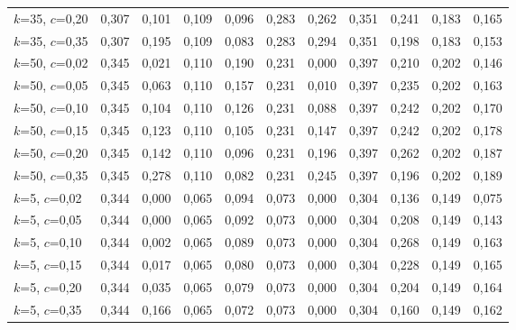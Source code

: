 \begin{longtable}{lrrrrrrrrrr}
$k$=35, $c$=0,20 & 0,307 & 0,101 & 0,109 & 0,096 & 0,283 & 0,262 & 0,351 & 0,241 & 0,183 & 0,165 \\
$k$=35, $c$=0,35 & 0,307 & 0,195 & 0,109 & 0,083 & 0,283 & 0,294 & 0,351 & 0,198 & 0,183 & 0,153 \\
$k$=50, $c$=0,02 & 0,345 & 0,021 & 0,110 & 0,190 & 0,231 & 0,000 & 0,397 & 0,210 & 0,202 & 0,146 \\
$k$=50, $c$=0,05 & 0,345 & 0,063 & 0,110 & 0,157 & 0,231 & 0,010 & 0,397 & 0,235 & 0,202 & 0,163 \\
$k$=50, $c$=0,10 & 0,345 & 0,104 & 0,110 & 0,126 & 0,231 & 0,088 & 0,397 & 0,242 & 0,202 & 0,170 \\
$k$=50, $c$=0,15 & 0,345 & 0,123 & 0,110 & 0,105 & 0,231 & 0,147 & 0,397 & 0,242 & 0,202 & 0,178 \\
$k$=50, $c$=0,20 & 0,345 & 0,142 & 0,110 & 0,096 & 0,231 & 0,196 & 0,397 & 0,262 & 0,202 & 0,187 \\
$k$=50, $c$=0,35 & 0,345 & 0,278 & 0,110 & 0,082 & 0,231 & 0,245 & 0,397 & 0,196 & 0,202 & 0,189 \\
$k$=5, $c$=0,02 & 0,344 & 0,000 & 0,065 & 0,094 & 0,073 & 0,000 & 0,304 & 0,136 & 0,149 & 0,075 \\
$k$=5, $c$=0,05 & 0,344 & 0,000 & 0,065 & 0,092 & 0,073 & 0,000 & 0,304 & 0,208 & 0,149 & 0,143 \\
$k$=5, $c$=0,10 & 0,344 & 0,002 & 0,065 & 0,089 & 0,073 & 0,000 & 0,304 & 0,268 & 0,149 & 0,163 \\
$k$=5, $c$=0,15 & 0,344 & 0,017 & 0,065 & 0,080 & 0,073 & 0,000 & 0,304 & 0,228 & 0,149 & 0,165 \\
$k$=5, $c$=0,20 & 0,344 & 0,035 & 0,065 & 0,079 & 0,073 & 0,000 & 0,304 & 0,204 & 0,149 & 0,164 \\
$k$=5, $c$=0,35 & 0,344 & 0,166 & 0,065 & 0,072 & 0,073 & 0,000 & 0,304 & 0,160 & 0,149 & 0,162 \\
\bottomrule
\end{longtable}
